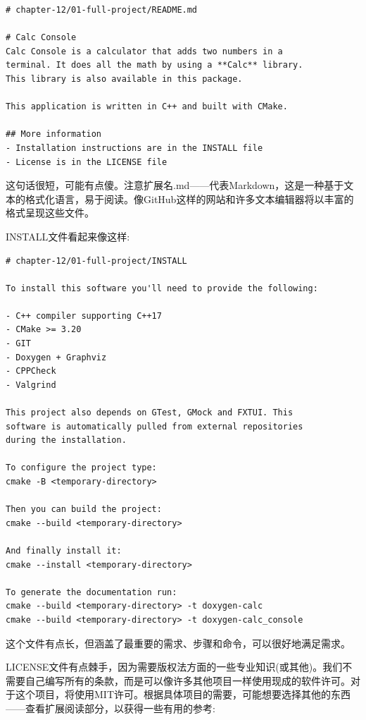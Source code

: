 \begin{lstlisting}[style=stylePython]
# chapter-12/01-full-project/README.md

# Calc Console
Calc Console is a calculator that adds two numbers in a
terminal. It does all the math by using a **Calc** library.
This library is also available in this package.

This application is written in C++ and built with CMake.

## More information
- Installation instructions are in the INSTALL file
- License is in the LICENSE file
\end{lstlisting}

这句话很短，可能有点傻。注意扩展名.md——代表Markdown，这是一种基于文本的格式化语言，易于阅读。像GitHub这样的网站和许多文本编辑器将以丰富的格式呈现这些文件。

INSTALL文件看起来像这样:

\begin{lstlisting}[style=stylePython]
# chapter-12/01-full-project/INSTALL

To install this software you'll need to provide the following:

- C++ compiler supporting C++17
- CMake >= 3.20
- GIT
- Doxygen + Graphviz
- CPPCheck
- Valgrind

This project also depends on GTest, GMock and FXTUI. This
software is automatically pulled from external repositories
during the installation.

To configure the project type:
cmake -B <temporary-directory>

Then you can build the project:
cmake --build <temporary-directory>

And finally install it:
cmake --install <temporary-directory>

To generate the documentation run:
cmake --build <temporary-directory> -t doxygen-calc
cmake --build <temporary-directory> -t doxygen-calc_console
\end{lstlisting}

这个文件有点长，但涵盖了最重要的需求、步骤和命令，可以很好地满足需求。

LICENSE文件有点棘手，因为需要版权法方面的一些专业知识(或其他)。我们不需要自己编写所有的条款，而是可以像许多其他项目一样使用现成的软件许可。对于这个项目，将使用MIT许可。根据具体项目的需要，可能想要选择其他的东西——查看扩展阅读部分，以获得一些有用的参考:

